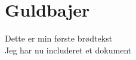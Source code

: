 \chapter{Guldbajer}
Dette er min første brødtekst \\
\phantom{mmmm}Jeg har nu includeret et dokument